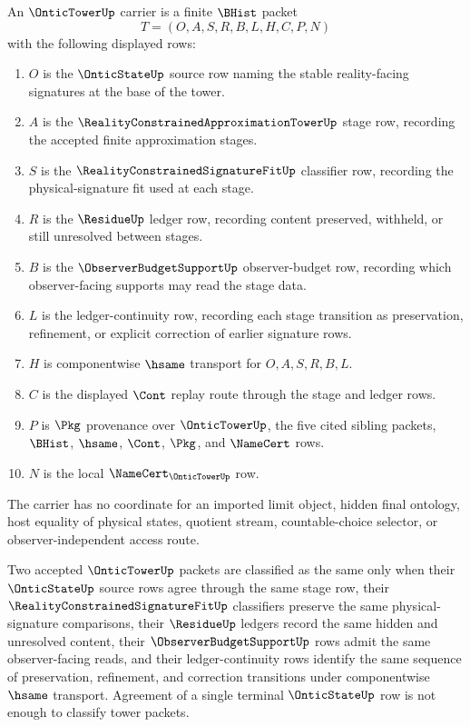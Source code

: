 \begin{definition}
\label{def:ontic-tower-carrier}
An $\OnticTowerUp$ carrier is a finite $\BHist$ packet
$$
T=(O,A,S,R,B,L,H,C,P,N)
$$
with the following displayed rows:
\begin{enumerate}
\item $O$ is the $\OnticStateUp$ source row naming the stable reality-facing signatures at the base of the tower.
\item $A$ is the $\RealityConstrainedApproximationTowerUp$ stage row, recording the accepted finite approximation stages.
\item $S$ is the $\RealityConstrainedSignatureFitUp$ classifier row, recording the physical-signature fit used at each stage.
\item $R$ is the $\ResidueUp$ ledger row, recording content preserved, withheld, or still unresolved between stages.
\item $B$ is the $\ObserverBudgetSupportUp$ observer-budget row, recording which observer-facing supports may read the stage data.
\item $L$ is the ledger-continuity row, recording each stage transition as preservation, refinement, or explicit correction of earlier signature rows.
\item $H$ is componentwise $\hsame$ transport for $O,A,S,R,B,L$.
\item $C$ is the displayed $\Cont$ replay route through the stage and ledger rows.
\item $P$ is $\Pkg$ provenance over $\OnticTowerUp$, the five cited sibling packets, $\BHist$, $\hsame$, $\Cont$, $\Pkg$, and $\NameCert$ rows.
\item $N$ is the local $\NameCert_{\OnticTowerUp}$ row.
\end{enumerate}
The carrier has no coordinate for an imported limit object, hidden final ontology, host equality of physical states, quotient stream, countable-choice selector, or observer-independent access route.
\end{definition}

\begin{definition}
\label{def:ontic-tower-classifier}
Two accepted $\OnticTowerUp$ packets are classified as the same only when their $\OnticStateUp$ source rows agree through the same stage row, their $\RealityConstrainedSignatureFitUp$ classifiers preserve the same physical-signature comparisons, their $\ResidueUp$ ledgers record the same hidden and unresolved content, their $\ObserverBudgetSupportUp$ rows admit the same observer-facing reads, and their ledger-continuity rows identify the same sequence of preservation, refinement, and correction transitions under componentwise $\hsame$ transport. Agreement of a single terminal $\OnticStateUp$ row is not enough to classify tower packets.
\end{definition}

